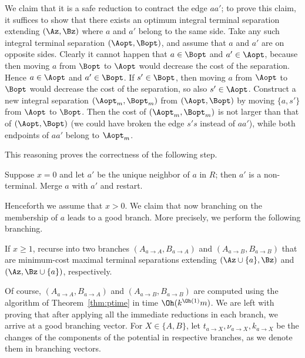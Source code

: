 We claim that it is a safe reduction to contract the edge $aa'$; to prove this claim, it suffices to show that there exists an optimum integral terminal separation extending $(\Az,\Bz)$ where $a$ and $a'$ belong to the same side. Take any such integral terminal separation $(\Aopt,\Bopt)$, and assume that $a$ and $a'$ are on opposite sides. Clearly it cannot happen that $a\in \Bopt$ and $a'\in \Aopt$, because then moving $a$ from $\Bopt$ to $\Aopt$ would decrease the cost of the separation. Hence $a\in \Aopt$ and $a'\in \Bopt$. If $s'\in \Bopt$, then moving $a$ from $\Aopt$ to $\Bopt$ would decrease the cost of the separation, so also $s'\in \Aopt$. Construct a new integral separation $(\Aopt_m,\Bopt_m)$ from $(\Aopt,\Bopt)$ by moving $\{a,s'\}$ from $\Aopt$ to $\Bopt$. Then the cost of $(\Aopt_m,\Bopt_m)$ is not larger than that of $(\Aopt,\Bopt)$ (we could have broken the edge $s's$ instead of $aa'$), while both endpoints of $aa'$ belong to $\Aopt_m$.

This reasoning proves the correctness of the following step.
\begin{reductionstep}
Suppose $x=0$ and let $a'$ be the unique neighbor of $a$ in $R$; then $a'$ is a non-terminal. Merge $a$ with $a'$ and restart.
\end{reductionstep}











Henceforth we assume that $x>0$. We claim that now branching on the membership of $a$ leads to a good branch. More precisely, we perform the following branching.

\begin{branching}
If $x\geq 1$, recurse into two branches $(A_{a\to A},B_{a\to A})$ and $(A_{a\to B},B_{a\to B})$ that are minimum-cost maximal terminal separations extending $(\Az\cup \{a\},\Bz)$ and $(\Az,\Bz\cup \{a\})$, respectively.
\end{branching}

Of course, $(A_{a\to A},B_{a\to A})$ and $(A_{a\to B},B_{a\to B})$ are computed using the algorithm of Theorem~\ref{thm:ptime} in time $\Oh(k^{\Oh(1)} m)$. We are left with proving that after applying all the immediate reductions in each branch, we arrive at a good branching vector. For $X\in \{A,B\}$, let $t_{a\to X},\nu_{a\to X},k_{a\to X}$ be the changes of the components of the potential in respective branches, as we denote them in branching vectors.

